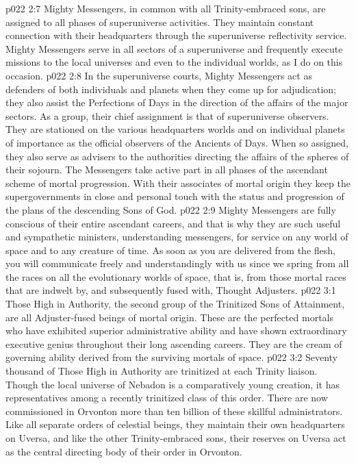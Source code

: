 \pc \vs p022 2:7 Mighty Messengers, in common with all Trinity\hyp{}embraced sons, are assigned to all phases of superuniverse activities. They maintain constant connection with their headquarters through the superuniverse reflectivity service. Mighty Messengers serve in all sectors of a superuniverse and frequently execute missions to the local universes and even to the individual worlds, as I do on this occasion.
\vs p022 2:8 In the superuniverse courts, Mighty Messengers act as defenders of both individuals and planets when they come up for adjudication; they also assist the Perfections of Days in the direction of the affairs of the major sectors. As a group, their chief assignment is that of superuniverse observers. They are stationed on the various headquarters worlds and on individual planets of importance as the official observers of the Ancients of Days. When so assigned, they also serve as advisers to the authorities directing the affairs of the spheres of their sojourn. The Messengers take active part in all phases of the ascendant scheme of mortal progression. With their associates of mortal origin they keep the supergovernments in close and personal touch with the status and progression of the plans of the descending Sons of God.
\vs p022 2:9 Mighty Messengers are fully conscious of their entire ascendant careers, and that is why they are such useful and sympathetic ministers, understanding messengers, for service on any world of space and to any creature of time. As soon as you are delivered from the flesh, you will communicate freely and understandingly with us since we spring from all the races on all the evolutionary worlds of space, that is, from those mortal races that are indwelt by, and subsequently fused with, Thought Adjusters.
\vs p022 3:1 Those High in Authority, the second group of the Trinitized Sons of Attainment, are all Adjuster\hyp{}fused beings of mortal origin. These are the perfected mortals who have exhibited superior administrative ability and have shown extraordinary executive genius throughout their long ascending careers. They are the cream of governing ability derived from the surviving mortals of space.
\vs p022 3:2 Seventy thousand of Those High in Authority are trinitized at each Trinity liaison. Though the local universe of Nebadon is a comparatively young creation, it has representatives among a recently trinitized class of this order. There are now commissioned in Orvonton more than ten billion of these skillful administrators. Like all separate orders of celestial beings, they maintain their own headquarters on Uversa, and like the other Trinity\hyp{}embraced sons, their reserves on Uversa act as the central directing body of their order in Orvonton.

